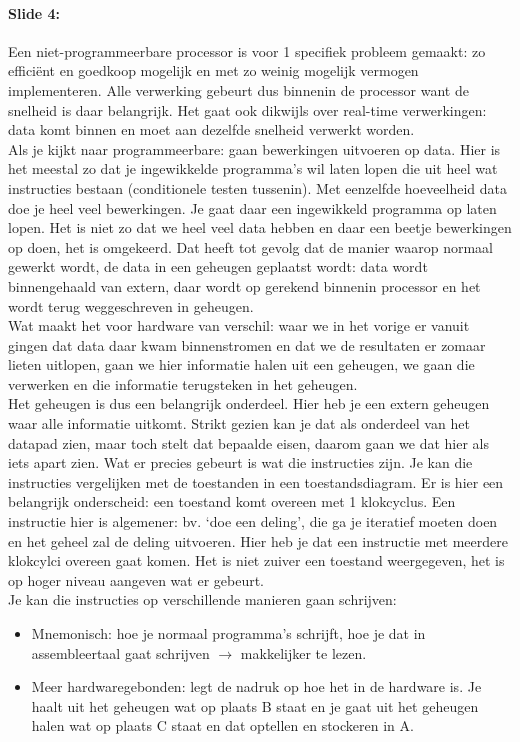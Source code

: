 \documentclass[10pt,a4paper]{book}
\begin{document}
\paragraph{Slide 4:} Een niet-programmeerbare processor is voor 1 specifiek probleem gemaakt: zo effici\"ent en goedkoop mogelijk en met zo weinig mogelijk vermogen implementeren. Alle verwerking gebeurt dus binnenin de processor want de snelheid is daar belangrijk. Het gaat ook dikwijls over real-time verwerkingen: data komt binnen en moet aan dezelfde snelheid verwerkt worden.\\
Als je kijkt naar programmeerbare: gaan bewerkingen uitvoeren op data. Hier is het meestal zo dat je ingewikkelde programma's wil laten lopen die uit heel wat instructies bestaan (conditionele testen tussenin). Met eenzelfde hoeveelheid data doe je heel veel bewerkingen. Je gaat daar een ingewikkeld programma op laten lopen. Het is niet zo dat we heel veel data hebben en daar een beetje bewerkingen op doen, het is omgekeerd. Dat heeft tot gevolg dat de manier waarop normaal gewerkt wordt, de data in een geheugen geplaatst wordt: data wordt binnengehaald van extern, daar wordt op gerekend binnenin processor en het wordt terug weggeschreven in geheugen.\\
Wat maakt het voor hardware van verschil: waar we in het vorige er vanuit gingen dat data daar kwam binnenstromen en dat we de resultaten er zomaar lieten uitlopen, gaan we hier informatie halen uit een geheugen, we gaan die verwerken en die informatie terugsteken in het geheugen. \\
Het geheugen is dus een belangrijk onderdeel. Hier heb je een extern geheugen waar alle informatie uitkomt. Strikt gezien kan je dat als onderdeel van het datapad zien, maar toch stelt dat bepaalde eisen, daarom gaan we dat hier als iets apart zien. Wat er precies gebeurt is wat die instructies zijn. Je kan die instructies vergelijken met de toestanden in een toestandsdiagram. Er is hier een belangrijk onderscheid: een toestand komt overeen met 1 klokcyclus. Een instructie hier is algemener: bv. `doe een deling', die ga je iteratief moeten doen en het geheel zal de deling uitvoeren. Hier heb je dat een instructie met meerdere klokcylci overeen gaat komen. Het is niet zuiver een toestand weergegeven, het is op hoger niveau aangeven wat er gebeurt.\\
Je kan die instructies op verschillende manieren gaan schrijven:
\begin{itemize}
\item Mnemonisch: hoe je normaal programma's schrijft, hoe je dat in assembleertaal gaat schrijven $\rightarrow$ makkelijker te lezen.
\item Meer hardwaregebonden: legt de nadruk op hoe het in de hardware is. Je haalt uit het geheugen wat op plaats B staat en je gaat uit het geheugen halen wat op plaats C staat en dat optellen en stockeren in A. 
\end{itemize}
\end{document}
